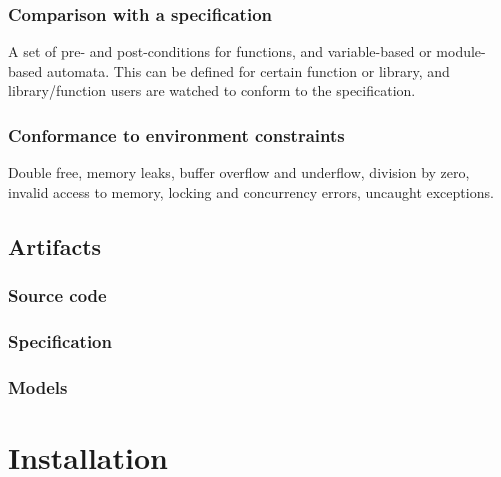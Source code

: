 \documentclass[a4paper]{book}
\begin{document}
\subsection{Comparison with a specification}
A set of pre- and post-conditions for functions, and variable-based or
module-based automata.  This can be defined for certain function or
library, and library/function users are watched to conform to the
specification.

\subsection{Conformance to environment constraints}
Double free, memory leaks, buffer overflow and underflow, division by
zero, invalid access to memory, locking and concurrency errors,
uncaught exceptions.

\section{Artifacts}
\subsection{Source code}
\subsection{Specification}
\subsection{Models}

\chapter{Installation}



\end{document}
